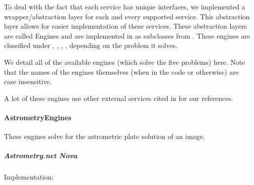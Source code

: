 \documentclass[letterpaper,11pt,english]{sphinxmanual}
\begin{document}
\sphinxAtStartPar
To deal with the fact that each service has unique interfaces, we implemented
a wrapper/abstraction layer for each and every supported service. This
abstraction layer allows for easier implementation of these services.
These abstraction layers are called Engines and are implemented in as
subclasses from {\hyperref[\detokenize{code/opihiexarata.library.engine:module-opihiexarata.library.engine}]{}}. These engines are
classified under
{\hyperref[\detokenize{technical/architecture/services_engines:technical-architecture-services-engines-astrometryengines}]{}},
{\hyperref[\detokenize{technical/architecture/services_engines:technical-architecture-services-engines-photometryengines}]{}},
{\hyperref[\detokenize{technical/architecture/services_engines:technical-architecture-services-engines-orbitengines}]{}},
{\hyperref[\detokenize{technical/architecture/services_engines:technical-architecture-services-engines-ephemerisengines}]{}},
{\hyperref[\detokenize{technical/architecture/services_engines:technical-architecture-services-engines-propagationengines}]{}}
depending on the problem it solves.

\sphinxAtStartPar
We detail all of the available engines (which solve the five problems) here.
Note that the names of the engines themselves (when in the code or otherwise)
are case insensitive.

\sphinxAtStartPar
A lot of these engines use other external services cited in
{\hyperref[\detokenize{user/citations:user-citations}]{}} for our references.


\paragraph{AstrometryEngines}
\label{\detokenize{technical/architecture/services_engines:astrometryengines}}\label{\detokenize{technical/architecture/services_engines:technical-architecture-services-engines-astrometryengines}}
\sphinxAtStartPar
These engines solve for the astrometric plate solution of an image.


\subparagraph{Astrometry.net Nova}
\label{\detokenize{technical/architecture/services_engines:astrometry-net-nova}}
\sphinxAtStartPar
Implementation: {\hyperref[\detokenize{code/opihiexarata.astrometry.webclient:opihiexarata.astrometry.webclient.AstrometryNetWebAPIEngine}]{}}
\end{document}
